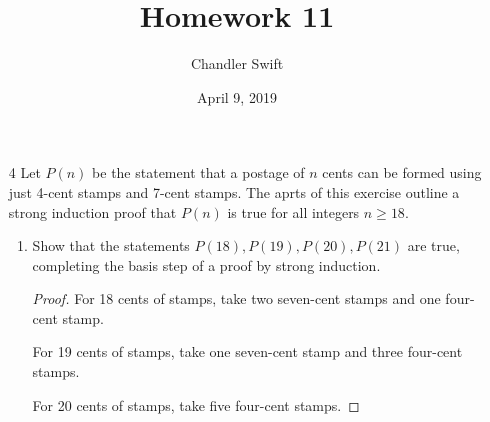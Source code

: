 \documentclass{article}
\title{Homework 11}
\author{Chandler Swift}
\date{April 9, 2019}
\begin{document}
\maketitle
\begin{enumerate}

%
%

  \item[4] Let $P(n)$ be the statement that a postage of $n$ cents can be
    formed using just 4-cent stamps and 7-cent stamps. The aprts of this
    exercise outline a strong induction proof that $P(n)$ is true for all
    integers $n \geq 18$. 
    \begin{enumerate}
      \item Show that the statements $P(18),P(19),P(20),P(21)$ are true,
        completing the basis step of a proof by strong induction.
        \begin{proof}
          For 18 cents of stamps, take two seven-cent stamps and one four-cent
          stamp.

          For 19 cents of stamps, take one seven-cent stamp and three four-cent
          stamps.

          For 20 cents of stamps, take five four-cent stamps.


\end{proof}
\end{enumerate}
\end{enumerate}
\end{document}
